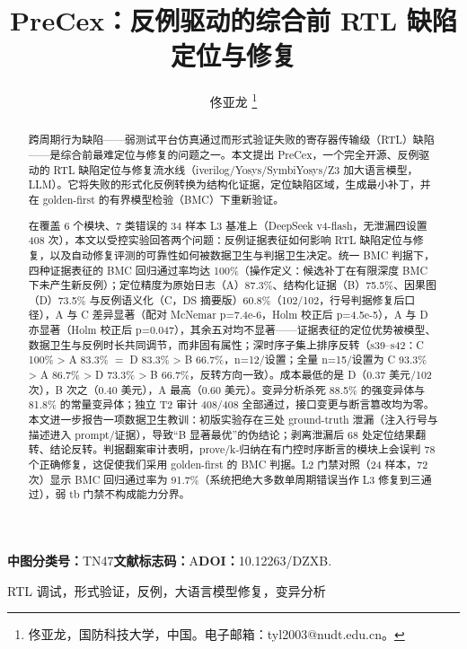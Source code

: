 \documentclass[journal]{IEEEtran}
\title{PreCex：反例驱动的综合前 RTL 缺陷定位与修复}
\author{佟亚龙%
\thanks{佟亚龙，国防科技大学，中国。电子邮箱：tyl2003@nudt.edu.cn。}}
\begin{document}
\maketitle

\noindent\textbf{中图分类号：}TN47\quad\textbf{文献标志码：}A\quad\textbf{DOI：}10.12263/DZXB.

\begin{abstract}
跨周期行为缺陷——弱测试平台仿真通过而形式验证失败的寄存器传输级（RTL）缺陷——是综合前最难定位与修复的问题之一。本文提出 PreCex，一个完全开源、反例驱动的 RTL 缺陷定位与修复流水线（iverilog/Yosys/SymbiYosys/Z3 加大语言模型，LLM）。它将失败的形式化反例转换为结构化证据，定位缺陷区域，生成最小补丁，并在 golden-first 的有界模型检验（BMC）下重新验证。

在覆盖 6 个模块、7 类错误的 34 样本 L3 基准上（DeepSeek v4-flash，无泄漏四设置 408 次），本文以受控实验回答两个问题：反例证据表征如何影响 RTL 缺陷定位与修复，以及自动修复评测的可靠性如何被数据卫生与判据卫生决定。统一 BMC 判据下，四种证据表征的 BMC 回归通过率均达 100\%（操作定义：候选补丁在有限深度 BMC 下未产生新反例）；定位精度为原始日志（A）87.3\%、结构化证据（B）75.5\%、因果图（D）73.5\% 与反例语义化（C，DS 摘要版）60.8\%（102/102，行号判据修复后口径），A 与 C 差异显著（配对 McNemar p=7.4e-6，Holm 校正后 p=4.5e-5），A 与 D 亦显著（Holm 校正后 p=0.047），其余五对均不显著——证据表征的定位优势被模型、数据卫生与反例时长共同调节，而非固有属性；深时序子集上排序反转（s39--s42：C 100\% > A 83.3\% $=$ D 83.3\% > B 66.7\%，n=12/设置；全量 n=15/设置为 C 93.3\% > A 86.7\% > D 73.3\% > B 66.7\%，反转方向一致）。成本最低的是 D（0.37 美元/102 次），B 次之（0.40 美元），A 最高（0.60 美元）。变异分析杀死 88.5\% 的强变异体与 81.8\% 的常量变异体；独立 T2 审计 408/408 全部通过，接口变更与断言篡改均为零。本文进一步报告一项数据卫生教训：初版实验存在三处 ground-truth 泄漏（注入行号与描述进入 prompt/证据），导致“B 显著最优”的伪结论；剥离泄漏后 68 处定位结果翻转、结论反转。判据翻案审计表明，prove/k-归纳在有门控时序断言的模块上会误判 78 个正确修复，这促使我们采用 golden-first 的 BMC 判据。L2 门禁对照（24 样本，72 次）显示 BMC 回归通过率为 91.7\%（系统把绝大多数单周期错误当作 L3 修复到三通过），弱 tb 门禁不构成能力分界。
\end{abstract}

\begin{IEEEkeywords}
RTL 调试，形式验证，反例，大语言模型修复，变异分析
\end{IEEEkeywords}
\end{document}

